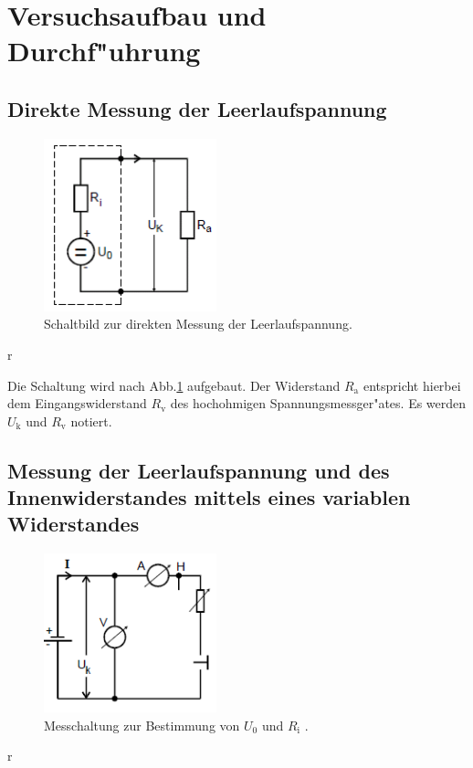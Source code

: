 \section{Versuchsaufbau und Durchf"uhrung} %
\label{sec:durchfuehrung}

\subsection{Direkte Messung der Leerlaufspannung} %
\label{sub:direkte_messung_der_leerlaufspannung}

\begin{figure}
	\centering
	\includegraphics[width = 5cm]{img/Monozelle.PNG}
	\caption{Schaltbild zur direkten Messung der Leerlaufspannung. \cite{anleitung}}
	\label{aufgabea}
\end{figure}{r}

Die Schaltung wird nach Abb.\ref{aufgabea} aufgebaut. Der Widerstand $R_\mathrm{a}$ entspricht hierbei dem Eingangswiderstand $R_\mathrm{v}$ des hochohmigen Spannungsmessger"ates.
Es werden $U_\mathrm{k}$ und $R_\mathrm{v}$ notiert.

\newpage

\subsection{Messung der Leerlaufspannung und des Innenwiderstandes mittels eines variablen Widerstandes} %
\label{sub:messung_der_leerlaufspannung_mittels_eines_variablen_widerstandes_}

\begin{figure}
	\centering
	\includegraphics[width = 5cm]{img/b.PNG}
	\caption{Messchaltung zur Bestimmung von $U_\mathrm{0}$ und $R_\mathrm{i}$ \cite{anleitung}.}
	\label{aufgabeb}
\end{figure}{r}

